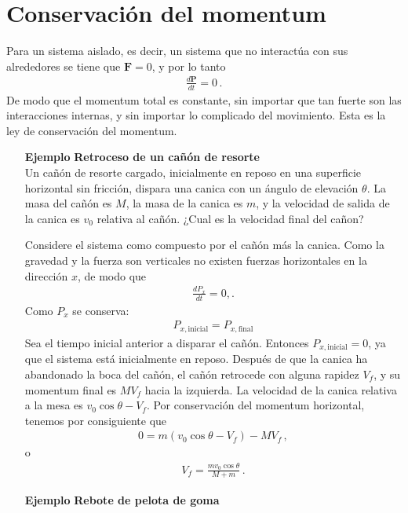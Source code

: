 \section{Conservación del momentum}
Para un sistema aislado, es decir, un sistema que no interactúa con sus alrededores se tiene que $\mathbf{F}=0$, y por lo tanto
\begin{align}
  \frac{d\mathbf{P}}{dt}=0\,.
\end{align}
De modo que el momentum total es constante, sin importar que tan fuerte son las interacciones internas, y sin importar lo complicado del movimiento. Esta es la ley de conservación del momentum.

\begin{itemize}
\item[\textbf{Ejemplo}] \textbf{Retroceso de un cañón de resorte}\\
Un cañón de resorte cargado, inicialmente en reposo en una superficie horizontal sin fricción, dispara una canica con un ángulo de elevación $\theta$. La masa del cañón es $M$, la masa de la canica es $m$, y la velocidad de salida de la canica es $v_0$ relativa al cañón. ¿Cual es la velocidad final del cañon?

Considere el sistema como compuesto por el cañón más la canica. Como la gravedad y la fuerza son verticales no existen fuerzas horizontales en la dirección $x$, de modo que
\begin{align}
  \frac{d P_x}{dt}=0,.
\end{align}
Como $P_x$ se conserva:
\begin{align}
  P_{x,\text{inicial}}=P_{x,\text{final}}
\end{align}
Sea el tiempo inicial anterior a disparar el cañón. Entonces $P_{x,\text{inicial}}=0$, ya que el sistema está inicialmente en reposo. Después de que la canica ha abandonado la boca del cañón, el cañón retrocede con alguna rapidez $V_f$, y su momentum final es $M V_f$ hacia la izquierda. La velocidad de la canica relativa a la  mesa es $v_0\cos\theta-V_f$. Por conservación del momentum horizontal, tenemos por consiguiente que
\begin{align}
  0=m(v_0\cos\theta-V_f)-M V_f\,,
\end{align}
o
\begin{align}
  V_f=\frac{m v_0\cos\theta}{M+m}\,.
\end{align}

\end{itemize}

\begin{itemize}
\item[\textbf{Ejemplo}] \textbf{Rebote de pelota de goma}
\end{itemize}

